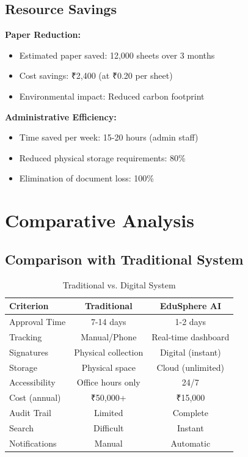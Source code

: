 \subsection{Resource Savings}

\textbf{Paper Reduction:}
\begin{itemize}
\item Estimated paper saved: 12,000 sheets over 3 months
\item Cost savings: ₹2,400 (at ₹0.20 per sheet)
\item Environmental impact: Reduced carbon footprint
\end{itemize}

\textbf{Administrative Efficiency:}
\begin{itemize}
\item Time saved per week: 15-20 hours (admin staff)
\item Reduced physical storage requirements: 80\%
\item Elimination of document loss: 100\%
\end{itemize}

\section{Comparative Analysis}

\subsection{Comparison with Traditional System}

\begin{table}[H]
\centering
\small
\begin{tabular}{|l|c|c|}
\hline
\textbf{Criterion} & \textbf{Traditional} & \textbf{EduSphere AI} \\
\hline
Approval Time & 7-14 days & 1-2 days \\
Tracking & Manual/Phone & Real-time dashboard \\
Signatures & Physical collection & Digital (instant) \\
Storage & Physical space & Cloud (unlimited) \\
Accessibility & Office hours only & 24/7 \\
Cost (annual) & ₹50,000+ & ₹15,000 \\
Audit Trail & Limited & Complete \\
Search & Difficult & Instant \\
Notifications & Manual & Automatic \\
\hline
\end{tabular}
\caption{Traditional vs. Digital System}
\end{table}

